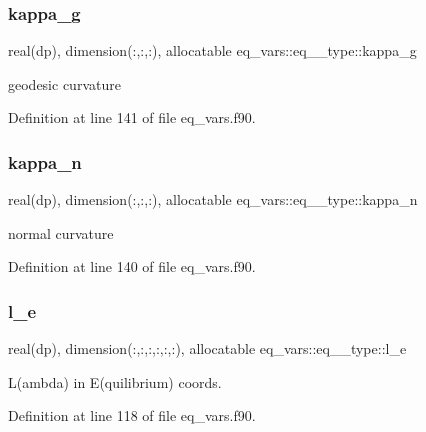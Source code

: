 \subsubsection{\texorpdfstring{kappa\+\_\+g}{kappa\_g}}
{\footnotesize\ttfamily real(dp), dimension(\+:,\+:,\+:), allocatable eq\+\_\+vars\+::eq\+\_\+\_\+type\+::kappa\+\_\+g}



geodesic curvature 



Definition at line 141 of file eq\+\_\+vars.\+f90.

\mbox{\label{structeq__vars_1_1eq__2__type_a4ddc178716da01997e4ee251554b7341}} 
\subsubsection{\texorpdfstring{kappa\+\_\+n}{kappa\_n}}
{\footnotesize\ttfamily real(dp), dimension(\+:,\+:,\+:), allocatable eq\+\_\+vars\+::eq\+\_\+\_\+type\+::kappa\+\_\+n}



normal curvature 



Definition at line 140 of file eq\+\_\+vars.\+f90.

\mbox{\label{structeq__vars_1_1eq__2__type_a88d3632a03817186dd805aa4f194b26b}} 
\subsubsection{\texorpdfstring{l\+\_\+e}{l\_e}}
{\footnotesize\ttfamily real(dp), dimension(\+:,\+:,\+:,\+:,\+:,\+:), allocatable eq\+\_\+vars\+::eq\+\_\+\_\+type\+::l\+\_\+e}



L(ambda) in E(quilibrium) coords. 



Definition at line 118 of file eq\+\_\+vars.\+f90.

